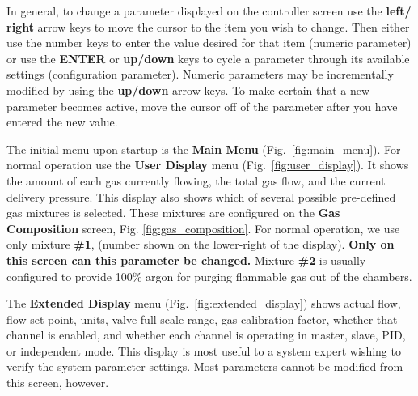 {In general, to change a parameter displayed on the controller screen
use the \textbf{left/ right} arrow keys to move the cursor to the item you
wish to change. Then either use the number keys to enter the value
desired for that item (numeric parameter) or use the {\bf ENTER} or
{\bf up/down} keys to cycle a parameter through its available settings
(configuration parameter). Numeric parameters may be incrementally
modified by using the {\bf up/down} arrow keys. To make certain that a
new parameter becomes active, move the cursor off of the parameter
after you have entered the new value.

The initial menu upon startup is the {\bf Main Menu}
(Fig.~\ref{fig:main_menu}).  For normal operation use the {\bf User
Display} menu (Fig.~\ref{fig:user_display}). It shows the amount of
each gas currently flowing, the total gas flow, and the current
delivery pressure. This display also shows which of several possible
pre-defined gas mixtures is selected. These mixtures are configured
on the {\bf Gas Composition} screen, Fig. \ref{fig:gas_composition}.
For normal operation, we use
only mixture {\bf \#1}, (number shown on the lower-right of the
display). {\bf Only on this screen can this parameter be changed.}
Mixture {\bf \#2} is usually configured to provide 100\% argon for
purging flammable gas out of the chambers.

The {\bf Extended Display} menu (Fig.~\ref{fig:extended_display})
shows actual flow, flow set point, units, valve full-scale range, gas
calibration factor, whether that channel is enabled, and whether each
channel is operating in master, slave, PID, or independent mode. This
display is most useful to a system expert wishing to verify the system
parameter settings.  Most parameters cannot be modified from this
screen, however.

}
